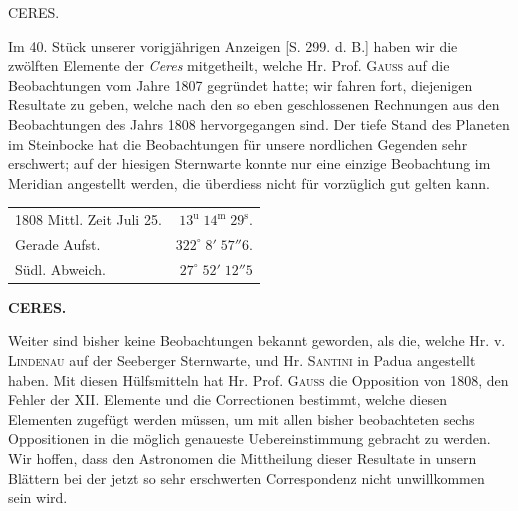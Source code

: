 \par{}\bigskip
\hypertarget{native-317-lower}{}
\begin{center}
\large CERES.
\end{center}

\par\indent Im 40. Stück unserer vorigjährigen Anzeigen [S. 299. d. B.] haben wir die zwölften Elemente der \emph{Ceres} mitgetheilt, welche Hr. Prof. \textsc{Gauss} auf die Beobachtungen vom Jahre 1807 gegründet hatte; wir fahren fort, diejenigen Resultate zu geben, welche nach den so eben geschlossenen Rechnungen aus den Beobachtungen des Jahrs 1808 hervorgegangen sind. Der tiefe Stand des Planeten im Steinbocke hat die Beobachtungen für unsere nordlichen Gegenden sehr erschwert; auf der hiesigen Sternwarte konnte nur eine einzige Beobachtung im Meridian angestellt werden, die überdiess nicht für vorzüglich gut gelten kann.


\begin{center}\fontsize{10}{12}\selectfont\setlength{\tabcolsep}{5pt}\renewcommand{\arraystretch}{1.15}\begin{tabular}{lr} 1808 Mittl. Zeit Juli 25. & $13^{\text{u}}\;14^{\text{m}}\;29^{\text{s}}$.\\ Gerade Aufst. & $322^\circ\;8'\;57''6$.\\ Südl. Abweich. & $27^\circ\;52'\;12''5$\\
\end{tabular}\end{center}


\clearpage
\thispagestyle{empty}
\noindent{}%
\makebox[12mm][l]{}%
\parbox[t]{\dimexpr\linewidth-24mm\relax}{\centering\footnotesize\bfseries CERES.\par}%
\par\nobreak\medskip
\par\indent Weiter sind bisher keine Beobachtungen bekannt geworden, als die, welche Hr. v. \textsc{Lindenau} auf der Seeberger Sternwarte, und Hr. \textsc{Santini} in Padua angestellt haben. Mit diesen Hülfsmitteln hat Hr. Prof. \textsc{Gauss} die Opposition von 1808, den Fehler der XII. Elemente und die Correctionen bestimmt, welche diesen Elementen zugefügt werden müssen, um mit allen bisher beobachteten sechs Oppositionen in die möglich genaueste Uebereinstimmung gebracht zu werden. Wir hoffen, dass den Astronomen die Mittheilung dieser Resultate in unsern Blättern bei der jetzt so sehr erschwerten Correspondenz nicht unwillkommen sein wird.

